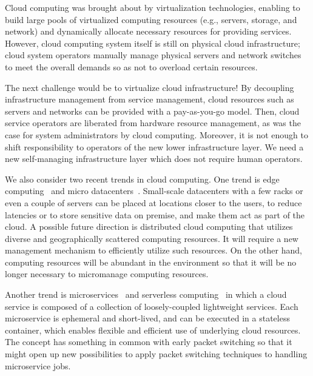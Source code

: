 
Cloud computing was brought about by virtualization technologies,
enabling to build large pools of virtualized computing resources (e.g.,
servers, storage, and network) and dynamically allocate necessary resources
for providing services.
However, cloud computing system itself is still on physical cloud
infrastructure; cloud system operators manually manage
physical servers and network switches to meet the overall demands
so as not to overload certain resources.

The next challenge would be to virtualize cloud infrastructure!
By decoupling infrastructure management from service management,
cloud resources such as servers and networks can be provided with a
pay-as-you-go model.
Then, cloud service operators are liberated from hardware resource management,
as was the case for system administrators by cloud computing.
Moreover, it is not enough to shift responsibility to operators of the
new lower infrastructure layer. We need a new self-managing
infrastructure layer which does not require human operators.

We also consider two recent trends in cloud computing.
One trend is edge computing~\cite{Lopez-2015} and
micro datacenters~\cite{Greenberg-2009}.
Small-scale datacenters with a few racks or even a couple of servers
can be placed at locations closer to the users, to reduce latencies
or to store sensitive data on premise, and make them act as part of
the cloud.
A possible future direction is distributed cloud computing that
utilizes diverse and geographically scattered computing resources.
It will require a new management mechanism to efficiently utilize such
resources.
On the other hand, computing resources will be abundant in the
environment so that it will be no longer necessary to micromanage
computing resources.

Another trend is microservices~\cite{nadareishvili2016microservice}
and serverless computing~\cite{Shafiei-2022} in which
a cloud service is composed of a collection of loosely-coupled
lightweight services.
Each microservice is ephemeral and short-lived, and can be executed
in a stateless container,
which enables flexible and efficient use of underlying cloud
resources.
The concept has something in common with early packet switching so
that it might open up new possibilities to apply packet switching
techniques to handling microservice jobs.

